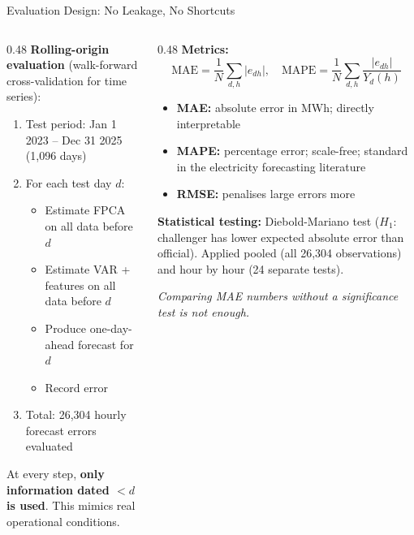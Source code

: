 \documentclass[10pt,aspectratio=169]{beamer}
\begin{document}
\begin{frame}{Evaluation Design: No Leakage, No Shortcuts}

  \begin{columns}
  \begin{column}{0.48\textwidth}
    \textbf{Rolling-origin evaluation}
    (walk-forward cross-validation for time series):
    \vspace{0.3em}
    \begin{enumerate}
      \item Test period: Jan 1 2023 -- Dec 31 2025 (1,096 days)
      \item For each test day $d$:
        \begin{itemize}
          \item Estimate FPCA on all data before $d$
          \item Estimate VAR + features on all data before $d$
          \item Produce one-day-ahead forecast for $d$
          \item Record error
        \end{itemize}
      \item Total: 26,304 hourly forecast errors evaluated
    \end{enumerate}
    \vspace{0.3em}
    At every step, \textbf{only information dated $< d$ is used}.
    This mimics real operational conditions.
  \end{column}
  \begin{column}{0.48\textwidth}
    \textbf{Metrics:}
    \[
      \text{MAE} = \frac{1}{N}\sum_{d,h}|e_{dh}|, \quad
      \text{MAPE} = \frac{1}{N}\sum_{d,h}\frac{|e_{dh}|}{Y_d(h)}
    \]
    \begin{itemize}
      \item \textbf{MAE:} absolute error in MWh; directly interpretable
      \item \textbf{MAPE:} percentage error; scale-free; standard in
        the electricity forecasting literature
      \item \textbf{RMSE:} penalises large errors more
    \end{itemize}

    \vspace{0.3em}
    \textbf{Statistical testing:} Diebold-Mariano test
    ($H_1$: challenger has lower expected absolute error than official).
    Applied pooled (all 26,304 observations) and
    hour by hour (24 separate tests).

    \vspace{0.3em}
    \textit{Comparing MAE numbers without a significance test is not enough.}
  \end{column}
  \end{columns}
\end{frame}
\end{document}
